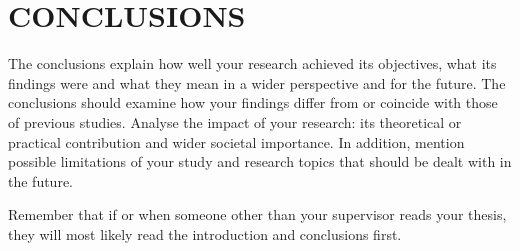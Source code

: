 \chapter{CONCLUSIONS}
The conclusions explain how well your research achieved its objectives, what its findings were and what they mean in a wider perspective and for the future. The conclusions should examine how your findings differ from or coincide with those of previous studies. Analyse the impact of your research: its theoretical or practical contribution and wider societal importance. In addition, mention possible limitations of your study and research topics that should be dealt with in the future.

Remember that if or when someone other than your supervisor reads your thesis, they will most likely read the introduction and conclusions first.